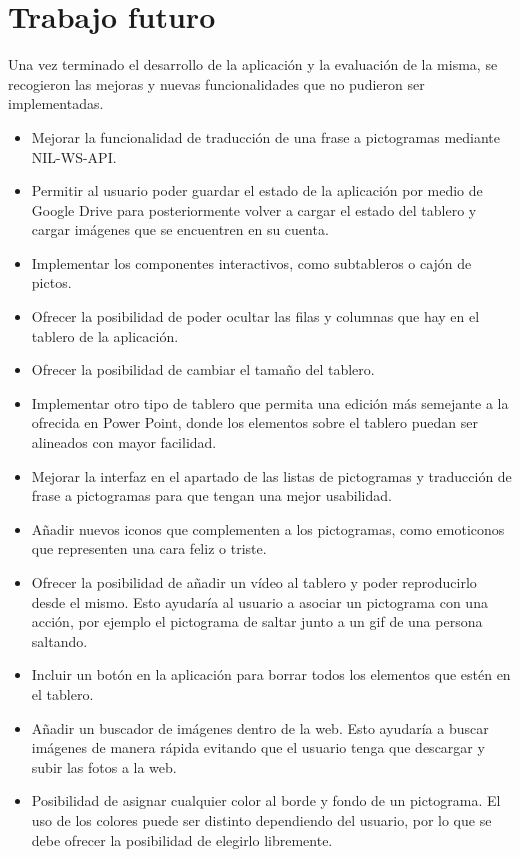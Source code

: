 \section{Trabajo futuro}
\label{cap7:sec:trabajofuturo}
Una vez terminado el desarrollo de la aplicación y la evaluación de la misma, se recogieron las mejoras y nuevas funcionalidades que no pudieron ser implementadas. 

\begin{itemize}
	\item Mejorar la funcionalidad de traducción de una frase a pictogramas mediante NIL-WS-API.
	\item Permitir al usuario poder guardar el estado de la aplicación por medio de Google Drive para posteriormente volver a cargar el estado del tablero y cargar imágenes que se encuentren en su cuenta.
	
	\item Implementar los componentes interactivos, como subtableros o cajón de pictos.
	
	\item Ofrecer la posibilidad de poder ocultar las filas y columnas que hay en el tablero de la aplicación.
	\item Ofrecer la posibilidad de cambiar el tamaño del tablero.
	
	\item Implementar otro tipo de tablero que permita una edición más semejante a la ofrecida en Power Point, donde los elementos sobre el tablero puedan ser alineados con mayor facilidad.  
	\item Mejorar la interfaz en el apartado de las listas de pictogramas y traducción de frase a pictogramas para que tengan una mejor usabilidad.
	
	\item Añadir nuevos iconos que complementen a los pictogramas, como emoticonos que representen una cara feliz o triste.
	
	\item Ofrecer la posibilidad de añadir un vídeo al tablero y poder reproducirlo desde el mismo. Esto ayudaría al usuario a asociar un pictograma con una acción, por ejemplo el pictograma de saltar junto a un gif de una persona saltando.
	
	\item Incluir un botón en la aplicación para borrar todos los elementos que estén en el tablero.
	
	\item Añadir un buscador de imágenes dentro de la web. Esto ayudaría a buscar imágenes de manera rápida evitando que el usuario tenga que descargar y subir las fotos a la web. 
	
	\item Posibilidad de asignar cualquier color al borde y fondo de un pictograma. El uso de los colores puede ser distinto dependiendo del usuario, por lo que se debe ofrecer la posibilidad de elegirlo libremente. 
	
\end{itemize}









